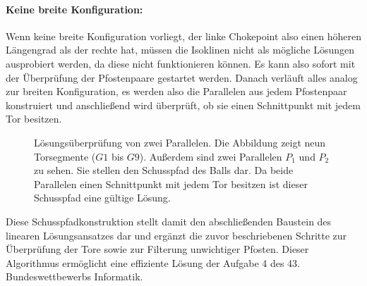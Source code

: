 \paragraph{Keine breite Konfiguration:}
Wenn keine breite Konfiguration vorliegt, der linke Chokepoint also einen höheren Längengrad als der rechte hat, müssen die Isoklinen nicht als mögliche Lösungen ausprobiert werden, da diese nicht funktionieren können. Es kann also sofort mit der Überprüfung der Pfostenpaare gestartet werden. Danach verläuft alles analog zur breiten Konfiguration, es werden also die Parallelen aus jedem Pfostenpaar konstruiert und anschließend wird überprüft, ob sie einen Schnittpunkt mit jedem Tor besitzen.

\begin{figure}[h]
\centering
\label{fig:schusspfad}
\caption{Lösungsüberprüfung von zwei Parallelen.
Die Abbildung zeigt neun Torsegmente (\(G1\) bis \(G9\)). Außerdem sind zwei Parallelen \(P_1\) und \(P_2\) zu sehen. Sie stellen den Schusspfad des Balls dar. Da beide Parallelen einen Schnittpunkt mit jedem Tor besitzen ist dieser Schusspfad eine gültige Lösung.}
\end{figure}

Diese Schusspfadkonstruktion stellt damit den abschließenden Baustein des linearen Lösungsansatzes dar und ergänzt die zuvor beschriebenen Schritte zur Überprüfung der Tore sowie zur Filterung unwichtiger Pfosten. Dieser Algorithmus ermöglicht eine effiziente Lösung der Aufgabe 4 des 43. Bundeswettbewerbs Informatik.

